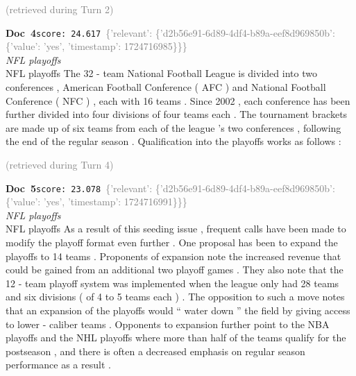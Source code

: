 \documentclass[a4paper,11pt]{article}
\begin{document}
\hfill{\tiny\textcolor{gray}{(retrieved during Turn 2)}}
\begin{docenv}
{\footnotesize\textcolor{doccolor}{\textbf{Doc~4}}}\hfill{\tiny\texttt{score:~24.617}}\ {\tiny\textcolor{gray}{\{'relevant': \{'d2b56e91-6d89-4df4-b89a-eef8d969850b': \{'value': 'yes', 'timestamp': 1724716985\}\}\}}}\\[3pt]
{\small\textit{NFL playoffs}}\\[2pt]
\vspace{2pt}
{\footnotesize NFL playoffs
The 32 - team National Football League is divided into two conferences , American Football Conference ( AFC ) and National Football Conference ( NFC ) , each with 16 teams . Since 2002 , each conference has been further divided into four divisions of four teams each . The tournament brackets are made up of six teams from each of the league 's two conferences , following the end of the regular season . Qualification into the playoffs works as follows :}
\end{docenv}
\hfill{\tiny\textcolor{gray}{(retrieved during Turn 4)}}
\begin{docenv}
{\footnotesize\textcolor{doccolor}{\textbf{Doc~5}}}\hfill{\tiny\texttt{score:~23.078}}\ {\tiny\textcolor{gray}{\{'relevant': \{'d2b56e91-6d89-4df4-b89a-eef8d969850b': \{'value': 'yes', 'timestamp': 1724716991\}\}\}}}\\[3pt]
{\small\textit{NFL playoffs}}\\[2pt]
\vspace{2pt}
{\footnotesize NFL playoffs
As a result of this seeding issue , frequent calls have been made to modify the playoff format even further . One proposal has been to expand the playoffs to 14 teams . Proponents of expansion note the increased revenue that could be gained from an additional two playoff games . They also note that the 12 - team playoff system was implemented when the league only had 28 teams and six divisions ( of 4 to 5 teams each ) . The opposition to such a move notes that an expansion of the playoffs would `` water down '' the field by giving access to lower - caliber teams . Opponents to expansion further point to the NBA playoffs and the NHL playoffs where more than half of the teams qualify for the postseason , and there is often a decreased emphasis on regular season performance as a result .}
\end{docenv}
\end{document}
